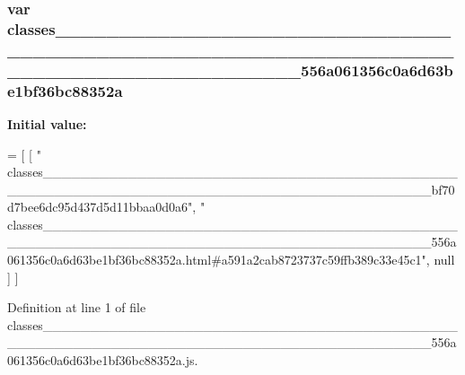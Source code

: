 \subsubsection[{classes\+\_\+\+\_\+\+\_\+\+\_\+\+\_\+\+\_\+\+\_\+\+\_\+\+\_\+\+\_\+\+\_\+\+\_\+\+\_\+\+\_\+\+\_\+\+\_\+\+\_\+\+\_\+\+\_\+\+\_\+\+\_\+\+\_\+\+\_\+\+\_\+\+\_\+\+\_\+\+\_\+\+\_\+\+\_\+\+\_\+\+\_\+\+\_\+\+\_\+\+\_\+\+\_\+\+\_\+\+\_\+\+\_\+\+\_\+\+\_\+\+\_\+\+\_\+\+\_\+\+\_\+\+\_\+\+\_\+\+\_\+\+\_\+\+\_\+\+\_\+\+\_\+\+\_\+\+\_\+\+\_\+\+\_\+\+\_\+\+\_\+\+\_\+\+\_\+\+\_\+\+\_\+\+\_\+\+\_\+\+\_\+\+\_\+\+\_\+\+\_\+\+\_\+\+\_\+\+\_\+\+\_\+\+\_\+\+\_\+\+\_\+\+\_\+\+\_\+\+\_\+\+\_\+\+\_\+\+\_\+\+\_\+\+\_\+\+\_\+\+\_\+\+\_\+\+\_\+\+\_\+\+\_\+\+\_\+556a061356c0a6d63be1bf36bc88352a}]{\setlength{\rightskip}{0pt plus 5cm}var classes\+\_\+\+\_\+\+\_\+\+\_\+\+\_\+\+\_\+\+\_\+\+\_\+\+\_\+\+\_\+\+\_\+\+\_\+\+\_\+\+\_\+\+\_\+\+\_\+\+\_\+\+\_\+\+\_\+\+\_\+\+\_\+\+\_\+\+\_\+\+\_\+\+\_\+\+\_\+\+\_\+\+\_\+\+\_\+\+\_\+\+\_\+\+\_\+\+\_\+\+\_\+\+\_\+\+\_\+\+\_\+\+\_\+\+\_\+\+\_\+\+\_\+\+\_\+\+\_\+\+\_\+\+\_\+\+\_\+\+\_\+\+\_\+\+\_\+\+\_\+\+\_\+\+\_\+\+\_\+\+\_\+\+\_\+\+\_\+\+\_\+\+\_\+\+\_\+\+\_\+\+\_\+\+\_\+\+\_\+\+\_\+\+\_\+\+\_\+\+\_\+\+\_\+\+\_\+\+\_\+\+\_\+\+\_\+\+\_\+\+\_\+\+\_\+\+\_\+\+\_\+\+\_\+\+\_\+\+\_\+\+\_\+\+\_\+\+\_\+\+\_\+\+\_\+\+\_\+\+\_\+\+\_\+\+\_\+556a061356c0a6d63be1bf36bc88352a}\label{classes_________________________________________________________________________________________5a61b7df103dbd1abf60be07b7d8c251_ab5727ba5123ffcec16ed1bf32d4e1fe0}
{\bfseries Initial value\+:}
\begin{DoxyCode}
=
[
    [ \textcolor{stringliteral}{"
      classes\_\_\_\_\_\_\_\_\_\_\_\_\_\_\_\_\_\_\_\_\_\_\_\_\_\_\_\_\_\_\_\_\_\_\_\_\_\_\_\_\_\_\_\_\_\_\_\_\_\_\_\_\_\_\_\_\_\_\_\_\_\_\_\_\_\_\_\_\_\_\_\_\_\_\_\_\_\_\_\_\_\_\_\_\_\_\_\_\_bf70d7bee6dc95d437d5d11bbaa0d0a6"}, \textcolor{stringliteral}{"
      classes\_\_\_\_\_\_\_\_\_\_\_\_\_\_\_\_\_\_\_\_\_\_\_\_\_\_\_\_\_\_\_\_\_\_\_\_\_\_\_\_\_\_\_\_\_\_\_\_\_\_\_\_\_\_\_\_\_\_\_\_\_\_\_\_\_\_\_\_\_\_\_\_\_\_\_\_\_\_\_\_\_\_\_\_\_\_\_\_\_556a061356c0a6d63be1bf36bc88352a.html#a591a2cab8723737c59ffb389c33e45c1"}, null ]
]
\end{DoxyCode}


Definition at line 1 of file classes\+\_\+\+\_\+\+\_\+\+\_\+\+\_\+\+\_\+\+\_\+\+\_\+\+\_\+\+\_\+\+\_\+\+\_\+\+\_\+\+\_\+\+\_\+\+\_\+\+\_\+\+\_\+\+\_\+\+\_\+\+\_\+\+\_\+\+\_\+\+\_\+\+\_\+\+\_\+\+\_\+\+\_\+\+\_\+\+\_\+\+\_\+\+\_\+\+\_\+\+\_\+\+\_\+\+\_\+\+\_\+\+\_\+\+\_\+\+\_\+\+\_\+\+\_\+\+\_\+\+\_\+\+\_\+\+\_\+\+\_\+\+\_\+\+\_\+\+\_\+\+\_\+\+\_\+\+\_\+\+\_\+\+\_\+\+\_\+\+\_\+\+\_\+\+\_\+\+\_\+\+\_\+\+\_\+\+\_\+\+\_\+\+\_\+\+\_\+\+\_\+\+\_\+\+\_\+\+\_\+\+\_\+\+\_\+\+\_\+\+\_\+\+\_\+\+\_\+\+\_\+\+\_\+\+\_\+\+\_\+\+\_\+\+\_\+\+\_\+\+\_\+\+\_\+\+\_\+\+\_\+\+\_\+\+\_\+556a061356c0a6d63be1bf36bc88352a.\+js.

